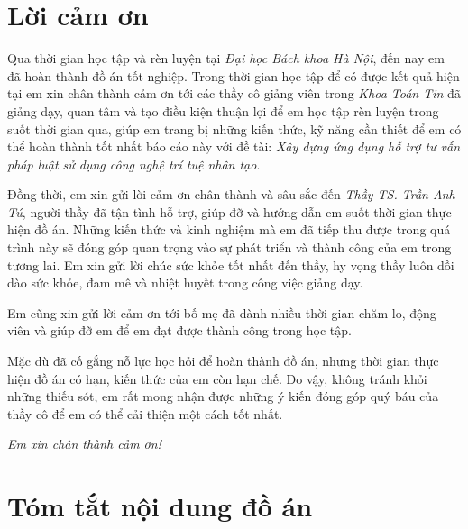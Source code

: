 {\centering \section*{Lời cảm ơn}}

Qua thời gian học tập và rèn luyện tại
\textit{Đại học Bách khoa Hà Nội},
đến nay em đã hoàn thành đồ án tốt nghiệp.
Trong thời gian học tập để có được kết quả hiện tại
em xin chân thành cảm ơn tới các thầy cô giảng viên trong \textit{Khoa Toán Tin}
đã giảng dạy, quan tâm và tạo điều kiện thuận lợi để em học tập rèn luyện trong suốt thời gian qua,
giúp em trang bị những kiến thức, kỹ năng cần thiết
để em có thể hoàn thành tốt nhất báo cáo này
với
đề tài:
\textit{Xây dựng ứng dụng hỗ trợ tư vấn pháp luật sử dụng công nghệ trí tuệ nhân tạo}.

Đồng thời, em xin gửi lời cảm ơn chân thành và sâu sắc đến \textit{Thầy TS. Trần Anh Tú},
người thầy đã tận tình hỗ trợ,
giúp đỡ và hướng dẫn em suốt thời gian thực hiện đồ án.
Những kiến thức và kinh nghiệm mà em đã tiếp thu được trong quá trình này
sẽ đóng góp quan trọng vào sự phát triển và thành công của em trong tương lai.
Em xin gửi lời chúc sức khỏe tốt nhất đến thầy,
hy vọng thầy luôn dồi dào sức khỏe, đam mê và nhiệt huyết trong công việc giảng dạy.

Em cũng xin gửi lời cảm ơn tới bố mẹ
đã dành nhiều thời gian chăm lo, động viên
và giúp đỡ em để em đạt được thành công trong học tập.

Mặc dù đã cố gắng nỗ lực học hỏi để hoàn thành đồ án,
nhưng thời gian thực hiện đồ án có hạn,
kiến thức của em còn hạn chế.
Do vậy,
không tránh khỏi những thiếu sót,
em rất mong nhận được những ý kiến đóng góp quý báu của thầy cô
để em có thể cải thiện một cách tốt nhất.

\vspace{0.5cm} \emph{Em xin chân thành cảm ơn!}


{\centering \section*{Tóm tắt nội dung đồ án}}



